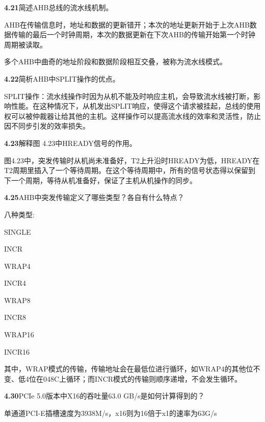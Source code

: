 \documentclass{article}
\begin{document}
    \noindent\textbf{4.21}简述AHB总线的流水线机制。\par
    AHB在传输信息时，地址和数据的更新错开；本次的地址更新开始于上次AHB数据传输的最后一个时钟周期，本次的数据更新在下次AHB的传输开始第一个时钟周期被读取。\par
多个AHB中曲奇的地址阶段和数据阶段相互交叠，被称为流水线模式。
    \\[4pt]\par

    \noindent\textbf{4.22}简析AHB中SPLIT操作的优点。\par
    SPLIT操作：流水线操作时因为从机不能及时响应主机，会导致流水线被打断，影响性能。在这种情况下，从机发出SPLIT响应，使得这个请求被挂起，总线的使用权可以被仲裁器让给其他的主机。这样操作可以提高流水线的效率和灵活性，防止因不同步引发的效率损失。
    \\[4pt]\par

    \noindent\textbf{4.23}解释图 4.23中HREADY信号的作用。\par
    图4.23中，突发传输时从机尚未准备好，T2上升沿时HREADY为低，HREADY在T2周期里插入了一个等待周期。在这个等待周期中，所有的信号状态得以保留到下一个周期，等待从机准备好，保证了主机从机操作的同步。
    \\[4pt]\par

    \noindent\textbf{4.25}AHB中突发传输定义了哪些类型？各自有什么特点？\par
    八种类型:\par
    \quad{}SINGLE\par
    \quad{}INCR\par
    \quad{}WRAP4\par
    \quad{}INCR4\par
    \quad{}WRAP8\par
    \quad{}INCR8\par
    \quad{}WRAP16\par
    \quad{}INCR16\par
    其中，WRAP模式的传输，传输地址会在最低位进行循环，如WRAP4的其他位不变、低4位在048C上循环；而INCR模式的传输则顺序递增，不会发生循环。
    \\[4pt]\par

    \noindent\textbf{4.30}PCIe 5.0版本中X16的吞吐量63.0 GB/s是如何计算得到的？\par
    单通道PCI-E插槽速度为3938M/s，x16则为16倍于x1的速率为63G/s
    \\[4pt]\par
\end{document}
